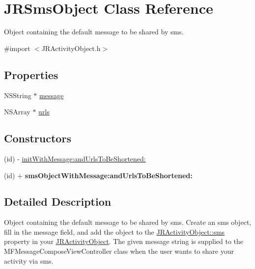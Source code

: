 \hypertarget{interface_j_r_sms_object}{
\section{JRSmsObject Class Reference}
\label{interface_j_r_sms_object}
}


Object containing the default message to be shared by sms.  




{\ttfamily \#import $<$JRActivityObject.h$>$}

\subsection*{Properties}
\begin{DoxyCompactItemize}
\item 
NSString $\ast$ \hyperlink{interface_j_r_sms_object_a6d74c049eba0e6ecfae0e25cffd77d6e}{message}
\item 
NSArray $\ast$ \hyperlink{interface_j_r_sms_object_a181c9385d2dc5ade8b096e2302a47a50}{urls}
\end{DoxyCompactItemize}
\subsection*{Constructors}
\label{_amgrp559a25fdb98a7d1fd1c3771ac568d5e9}
 \begin{DoxyCompactItemize}
\item 
(id) -\/ \hyperlink{interface_j_r_sms_object_a7669f3987b203f6235c5d6e9b0b81535}{initWithMessage:andUrlsToBeShortened:}
\item 
\hypertarget{interface_j_r_sms_object_a7405d41cfdc3add99e5f8c8c8d1f9c10}{
(id) + {\bfseries smsObjectWithMessage:andUrlsToBeShortened:}}
\label{interface_j_r_sms_object_a7405d41cfdc3add99e5f8c8c8d1f9c10}

\end{DoxyCompactItemize}


\subsection{Detailed Description}
Object containing the default message to be shared by sms. Create an sms object, fill in the message field, and add the object to the \hyperlink{interface_j_r_activity_object_a7719b59135bd02dbd03d4b35b17cb0a0}{JRActivityObject::sms} property in your \hyperlink{interface_j_r_activity_object}{JRActivityObject}. The given message string is supplied to the MFMessageComposeViewController class when the user wants to share your activity via sms.

